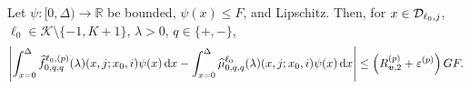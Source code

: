 \begin{lem}\label{lem: Dcoajc}
	Let \(\psi:[0,\Delta)\to \mathbb R\) be bounded, \(\psi(x)\leq F\), and Lipschitz. Then, for \(x\in\mathcal{D}_{\ell_0,j}\), \(\ell_0\in\mathcal K\setminus\{-1,K+1\}\), \(\lambda > 0\), \(q\in\{+,-\}\), 
	\begin{align}
		\left|\int_{x=0}^\Delta \widehat f^{\ell_0,(p)}_{0,q,q}(\lambda)(x,j; x_0,i)\psi(x)\, \mathrm{d} x - \int_{x=0}^\Delta\widehat \mu^{\ell_0}_{0,q,q}(\lambda)(x,j; x_0,i)\psi(x)\, \mathrm{d} x\right| \leq \left(R_{{\boldsymbol v},2}^{(p)} + \varepsilon^{(p)}\right) GF.
		\label{eqn: anue}
	\end{align}
\end{lem}

